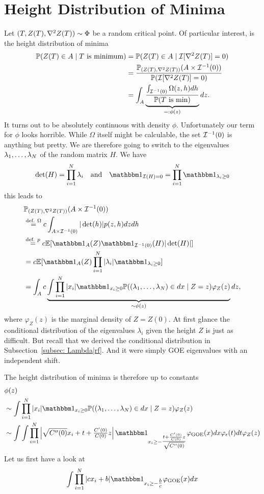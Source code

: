 \section{Height Distribution of Minima}

Let \((T,Z(T),\nabla^2Z(T))\sim\Phi\) be a random critical point.
Of particular interest, is the height distribution of minima
\[\begin{aligned}
	\mathbb{P}(Z(T)\in A \mid T\text{ is minimum})
	&=\mathbb{P}(Z(T)\in A \mid \mathcal{I}[\nabla^2Z(T)]=0)\\
	&= \frac{\mathbb{P}_{(Z(T), \nabla^2Z(T))}(A\times \mathcal{I}^{-1}(0))}{\mathbb{P}(\mathcal{I}[\nabla^2Z(T)]=0)}\\
	&= \int_A \underbrace{
		\frac{\int_{\mathcal{I}^{-1}(0)} \Omega(z,h) dh}{\mathbb{P}(T\text{ is min})}
	}_{=: \phi(z)} dz.
\end{aligned}\]
It turns out to be absolutely continuous with density \(\phi\). Unfortunately
our term for \(\phi\) looks horrible. While \(\Omega\) itself might be
calculable, the set \(\mathcal{I}^{-1}(0)\) is anything but pretty. We are therefore
going to switch to the eigenvalues \(\lambda_1,\dots,\lambda_N\) of
the random matrix \(H\). We have
\[
	\det(H) = \prod_{i=1}^\dimension \lambda_i
	\quad\text{and}\quad
	\ind_{\negEV(H) = 0} = \prod_{i=1}^\dimension \ind_{\lambda_i\ge 0}
\]
this leads to 
\[\begin{aligned}
	&\Pr_{(\rf(T), \nabla^2\rf(T))}(A\times \negEV^{-1}(0))\\
	&\overset{\text{def. }\Omega}= c\int_{A\times\negEV^{-1}(0)} |\det(h)| p(z,h)dz dh\\
	&\overset{\text{def. } p}= c\E[\ind_{A}(Z)\ind_{\negEV^{-1}(0)}(H)|\det(H)|]\\
	&= c\E[\ind_{A}(Z)\prod_{i=1}^\dimension |\lambda_i| \ind_{\lambda_i \ge 0}]\\
	&= \int_A c\underbrace{
		\int \prod_{i=1}^\dimension |x_i| \ind_{x_i\ge 0}
		\Pr((\lambda_1,\dots,\lambda_\dimension)\in dx\mid Z=z) \varphi_Z(z)
	}_{\sim\phi(z)}
	dz,
\end{aligned}\]
where \(\varphi_Z(z)\) is the marginal density of \(Z=Z(0)\). At first glance
the conditional distribution of the eigenvalues \(\lambda_i\) given the
height \(Z\) is just as difficult. But recall that we derived the conditional
distribution in Subsection~\ref{subsec: Lambda|rf}. And
it were simply GOE eigenvalues with an independent shift.

The height distribution
of minima is therefore up to constants
\[\begin{aligned}
	&\phi(z)\\
	&\sim\int \prod_{i=1}^\dimension |x_i| \ind_{x_i\ge 0}
	\Pr((\lambda_1,\dots,\lambda_\dimension)\in dx\mid Z=z) \varphi_Z(z)\\
	&\sim\int \int \prod_{i=1}^\dimension
	\left|\sqrt{\sqC''(0)}x_i + t + \tfrac{\sqC'(0)}{\sqC(0)}z\right|
	\ind_{x_i\ge - \tfrac{t+\frac{\sqC'(0)}{\sqC(0)}z}{\sqrt{\sqC''(0)}}}
	\varphi_{\text{GOE}}(x) dx \varphi_\epsilon(t)dt \varphi_Z(z)\\
\end{aligned}\]
Let us first have a look at
\[
	\int\prod_{i=1}^\dimension |c x_i + b| \ind_{x_i \ge -\tfrac{b}{c}}\varphi_{\text{GOE}}(x)dx
\]